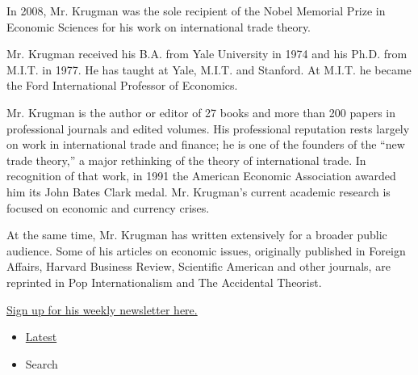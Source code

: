In 2008, Mr. Krugman was the sole recipient of the Nobel Memorial Prize
in Economic Sciences for his work on international trade theory.

Mr. Krugman received his B.A. from Yale University in 1974 and his Ph.D.
from M.I.T. in 1977. He has taught at Yale, M.I.T. and Stanford. At
M.I.T. he became the Ford International Professor of Economics.

Mr. Krugman is the author or editor of 27 books and more than 200 papers
in professional journals and edited volumes. His professional reputation
rests largely on work in international trade and finance; he is one of
the founders of the ``new trade theory,'' a major rethinking of the
theory of international trade. In recognition of that work, in 1991 the
American Economic Association awarded him its John Bates Clark medal.
Mr. Krugman's current academic research is focused on economic and
currency crises.

At the same time, Mr. Krugman has written extensively for a broader
public audience. Some of his articles on economic issues, originally
published in Foreign Affairs, Harvard Business Review, Scientific
American and other journals, are reprinted in Pop Internationalism and
The Accidental Theorist.

\href{https://www.nytimes3xbfgragh.onion/newsletters/paul-krugman}{Sign
up for his weekly newsletter here.}

\begin{itemize}
\tightlist
\item
  \protect\hyperlink{stream-panel}{Latest}
\item
  Search
\end{itemize}

